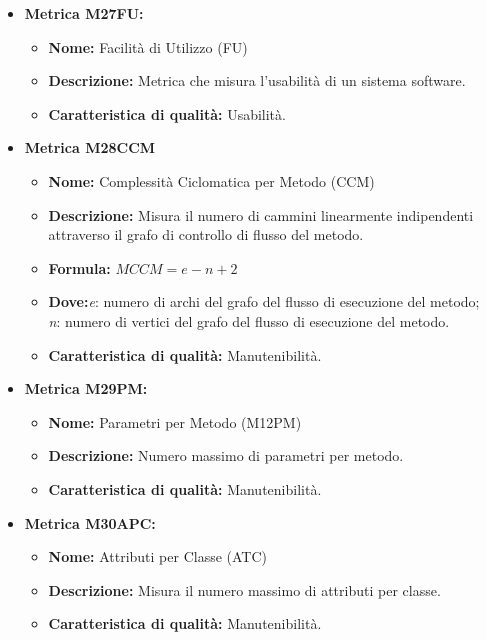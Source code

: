 \begin{itemize}
            \item \textbf{Metrica M27FU:}
                  \begin{itemize}
                      \item \textbf{Nome:} Facilità di Utilizzo (FU)
                      \item \textbf{Descrizione:} Metrica che misura l'usabilità di un sistema software.
                      \item \textbf{Caratteristica di qualità:} Usabilità.
                    \end{itemize}


            \item \textbf{Metrica M28CCM}
            \begin{itemize}
            \item \textbf{Nome:} Complessità Ciclomatica per Metodo (CCM)
            \item \textbf{Descrizione:} Misura il numero di cammini linearmente indipendenti attraverso il grafo di controllo di flusso del metodo.
            \item \textbf{Formula:} $MCCM = e - n + 2$
            \item \textbf{Dove:}\textit{e}: numero di archi del grafo del flusso di esecuzione del metodo;\\ \textit{n}: numero di vertici del grafo del flusso di esecuzione del metodo.
            \item \textbf{Caratteristica di qualità:} Manutenibilità.
        \end{itemize}
                                    

    \item \textbf{Metrica M29PM:}
        \begin{itemize}
            \item \textbf{Nome:} Parametri per Metodo (M12PM)
            \item \textbf{Descrizione:} Numero massimo di parametri per metodo.
            \item \textbf{Caratteristica di qualità:} Manutenibilità.
          \end{itemize}
    
    \item \textbf{Metrica M30APC:}
          \begin{itemize}
              \item \textbf{Nome:} Attributi per Classe (ATC)
              \item \textbf{Descrizione:} Misura il numero massimo di attributi per classe.
              \item \textbf{Caratteristica di qualità:} Manutenibilità.
          \end{itemize} 
          

\end{itemize}
